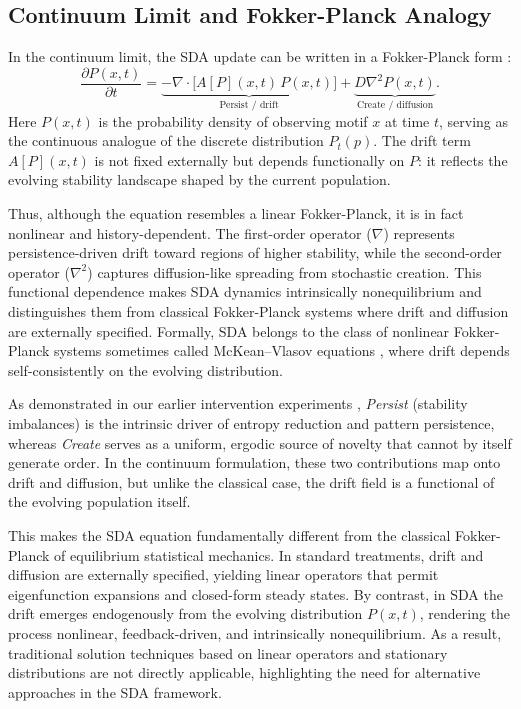 \documentclass[life,article,submit,pdftex,moreauthors]{Definitions/mdpi}
\begin{document}
\subsection{Continuum Limit and Fokker-Planck Analogy}

In the continuum limit, the SDA update can be written in a Fokker-Planck form \cite{gardiner2009}:
\begin{equation}
\frac{\partial P(x,t)}{\partial t}
= \underbrace{- \nabla \cdot \big[ A[P](x,t)\, P(x,t) \big]}_{\text{Persist / drift}}
+ \underbrace{D \nabla^2 P(x,t)}_{\text{Create / diffusion}}.
\end{equation}
Here $P(x,t)$ is the probability density of observing motif $x$ at time $t$, 
serving as the continuous analogue of the discrete distribution $P_t(p)$. 
The drift term $A[P](x,t)$ is not fixed externally but depends functionally on $P$: 
it reflects the evolving stability landscape shaped by the current population. 

Thus, although the equation resembles a linear Fokker-Planck, it is in fact nonlinear and history-dependent. 
The first-order operator ($\nabla$) represents persistence-driven drift toward regions of higher stability, 
while the second-order operator ($\nabla^2$) captures diffusion-like spreading from stochastic creation. 
This functional dependence makes SDA dynamics intrinsically nonequilibrium and distinguishes them from 
classical Fokker-Planck systems where drift and diffusion are externally specified. 
Formally, SDA belongs to the class of nonlinear Fokker-Planck systems sometimes called McKean--Vlasov equations \cite{mckean1966, villani2009}, 
where drift depends self-consistently on the evolving distribution.  

As demonstrated in our earlier intervention experiments \cite{adler_sda}, 
\textit{Persist} (stability imbalances) is the intrinsic driver of entropy 
reduction and pattern persistence, whereas \textit{Create} serves as a 
uniform, ergodic source of novelty that cannot by itself generate order.  
In the continuum formulation, these two contributions map onto drift and diffusion, 
but unlike the classical case, the drift field is a functional of the evolving 
population itself.  

This makes the SDA equation fundamentally different from the classical 
Fokker-Planck of equilibrium statistical mechanics. In standard treatments, 
drift and diffusion are externally specified, yielding linear operators that 
permit eigenfunction expansions and closed-form steady states. By contrast, 
in SDA the drift emerges endogenously from the evolving distribution $P(x,t)$, 
rendering the process nonlinear, feedback-driven, and intrinsically nonequilibrium.  
As a result, traditional solution techniques based on linear operators and 
stationary distributions are not directly applicable, highlighting the need 
for alternative approaches in the SDA framework.
\end{document}
